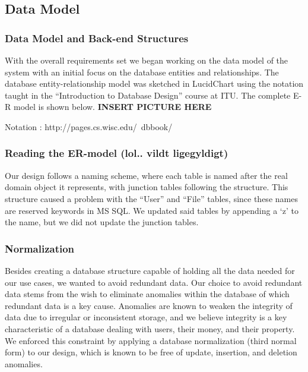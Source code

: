 \subsection{Data Model}
\subsubsection{Data Model and Back-end Structures}
\label{sec:datamodel}

With the overall requirements set we began working on the data model of the system with an initial focus on the database entities and relationships. The database entity-relationship model was sketched in LucidChart using the notation taught in the “Introduction to Database Design” course at ITU. The complete E-R  model is shown below.
\textbf{INSERT PICTURE HERE}

Notation : http://pages.cs.wisc.edu/~dbbook/

\subsubsection{Reading the ER-model (lol.. vildt ligegyldigt)}
\label{sec:readingdatamodel}
Our design follows a naming scheme, where each table is named after the real domain object it represents, with junction tables following the structure.
This structure caused a problem with the “User” and “File” tables, since these names are reserved keywords in MS SQL. We updated said tables by appending a ‘z’ to the name, but we did not update the junction tables.

\subsubsection{Normalization}
\label{sec:normalization}
Besides creating a database structure capable of holding all the data needed for our use cases, we wanted to avoid redundant data. Our choice to avoid redundant data stems from the wish to eliminate anomalies within the database of which redundant data is a key cause. Anomalies are known to weaken the integrity of data due to irregular or inconsistent storage, and we believe integrity is a key characteristic of a database dealing with users, their money, and their property. We enforced this constraint by applying a database normalization (third normal form) to our design, which is known to be free of update, insertion, and deletion anomalies.

